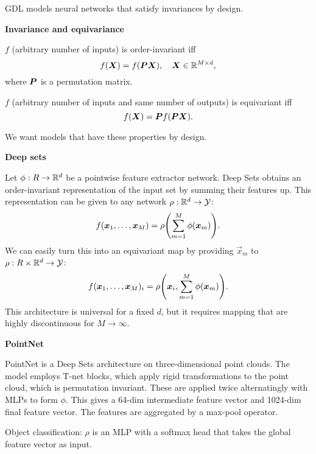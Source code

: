 \documentclass[10pt]{article}
\newenvironment{topic}[1]
{\textbf{\sffamily \colorbox{black}{\rlap{\textbf{\textcolor{white}{#1}}}\hspace{\linewidth}\hspace{-2\fboxsep}}}}
{}
\newenvironment{subtopic}[1]
{\begin{center}\textbf{\sffamily #1}\end{center}}
{}
\begin{document}
\begin{multicols*}{3}
\begin{topic}{Transformers}
    \end{topic}

    \begin{topic}{Geometric deep learning}
        GDL models neural networks that satisfy invariances by design.

        \begin{subtopic}{Invariance and equivariance}
            $f$ (arbitrary number of inputs) is order-invariant iff \[
                f(\bm{X}) = f(\bm{P}\bm{X}), \quad \bm{X} \in \mathbb{R}^{M \times d},
            \]
            where $\bm{P}$ is a permutation matrix.

            $f$ (arbitrary number of inputs and same number of outputs) is equivariant iff \[
                f(\bm{X}) = \bm{P} f(\bm{P} \bm{X}).
            \]

            We want models that have these properties by design.
        \end{subtopic}

        \begin{subtopic}{Deep sets}
            Let $\phi: R \to \mathbb{R}^d$ be a pointwise feature extractor network. Deep Sets obtains an
            order-invariant representation of the input set by summing their features up. This
            representation can be given to any network $\rho: \mathbb{R}^d \to \mathcal{Y}$: \[
                f(\vec{x}_1, \ldots, \vec{x}_M) = \rho \lft( \sum_{m=1}^{M} \phi(\vec{x}_m) \rgt).
            \]
            We can easily turn this into an equivariant map by providing $\vec{x}_m$ to $\rho: R \times \mathbb{R}^d
                \to \mathcal{Y}$: \[
                f(\vec{x}_1, \ldots, \vec{x}_M)_i = \rho \lft( \vec{x}_i, \sum_{m=1}^{M} \phi(\vec{x}_m) \rgt).
            \]
            This architecture is universal for a fixed $d$, but it requires mapping that are highly
            discontinuous for $M \to \infty$.
        \end{subtopic}

        \begin{subtopic}{PointNet}
            PointNet is a Deep Sets architecture on three-dimensional point clouds. The model employs
            T-net blocks, which apply rigid transformations to the point cloud, which is permutation
            invariant. These are applied twice alternatingly with MLPs to form $\phi$. This gives a
            64-dim intermediate feature vector and 1024-dim final feature vector. The features are
            aggregated by a max-pool operator.

            Object classification: $\rho$ is an MLP with a softmax head that takes the global feature vector as
            input.


\end{subtopic}
\end{topic}
\end{multicols*}
\end{document}
